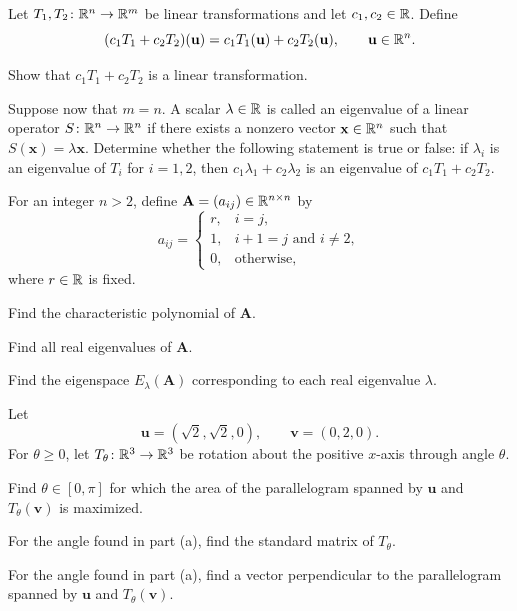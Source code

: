 \documentclass[11pt,oneside]{article}
\begin{document}
\begin{problem}
Let $T_1,T_2\colon\mathbb{R}^n\to\mathbb{R}^m$ be linear transformations and let $c_1,c_2\in\mathbb{R}$. Define
\[
(c_1T_1+c_2T_2)(\mathbf u)=c_1T_1(\mathbf u)+c_2T_2(\mathbf u),
\qquad \mathbf u\in\mathbb{R}^n.
\]
\begin{problemsubparts}
\item Show that $c_1T_1+c_2T_2$ is a linear transformation.
\item Suppose now that $m=n$. A scalar $\lambda\in\mathbb{R}$ is called an eigenvalue of a linear operator $S\colon\mathbb{R}^n\to\mathbb{R}^n$ if there exists a nonzero vector $\mathbf x\in\mathbb{R}^n$ such that $S(\mathbf x)=\lambda\mathbf x$. Determine whether the following statement is true or false: if $\lambda_i$ is an eigenvalue of $T_i$ for $i=1,2$, then $c_1\lambda_1+c_2\lambda_2$ is an eigenvalue of $c_1T_1+c_2T_2$.
\end{problemsubparts}
\end{problem}

\begin{problem}
For an integer $n>2$, define $\mathbf A=(a_{ij})\in\mathbb{R}^{n\times n}$ by
\[
a_{ij}=
\begin{cases}
r,&i=j,\\
1,&i+1=j\text{ and }i\ne2,\\
0,&\text{otherwise},
\end{cases}
\]
where $r\in\mathbb{R}$ is fixed.
\begin{problemsubparts}
\item Find the characteristic polynomial of $\mathbf A$.
\item Find all real eigenvalues of $\mathbf A$.
\item Find the eigenspace $E_\lambda(\mathbf A)$ corresponding to each real eigenvalue $\lambda$.
\end{problemsubparts}
\end{problem}

\begin{problem}
Let
\[
\mathbf u=(\sqrt2,\sqrt2,0),
\qquad
\mathbf v=(0,2,0).
\]
For $\theta\ge0$, let $T_\theta\colon\mathbb{R}^3\to\mathbb{R}^3$ be rotation about the positive $x$-axis through angle $\theta$.
\begin{problemsubparts}
\item Find $\theta\in[0,\pi]$ for which the area of the parallelogram spanned by $\mathbf u$ and $T_\theta(\mathbf v)$ is maximized.
\item For the angle found in part \textup{(a)}, find the standard matrix of $T_\theta$.
\item For the angle found in part \textup{(a)}, find a vector perpendicular to the parallelogram spanned by $\mathbf u$ and $T_\theta(\mathbf v)$.
\end{problemsubparts}
\end{problem}
\end{document}

